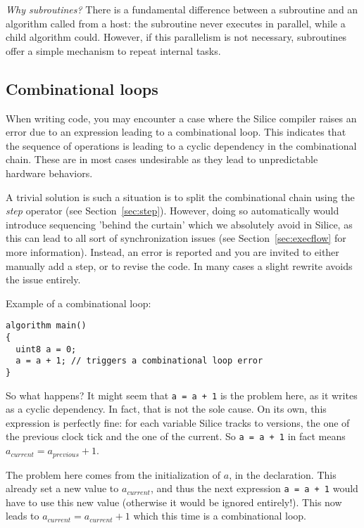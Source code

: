 \documentclass[a4]{article}
\newcommand\silice{Silice}
\begin{document}
\noindent \textit{Why subroutines?} There is a fundamental difference between a subroutine and an algorithm called from 
a host: the subroutine never executes in parallel, while a child algorithm could. However, if this parallelism is not necessary, 
subroutines offer a simple mechanism to repeat internal tasks.


\subsection{Combinational loops}

When writing code, you may encounter a case where the \silice{} compiler
raises an error due to an expression leading to a combinational loop. This
indicates that the sequence of operations is leading to a cyclic dependency
in the combinational chain. These are in most
cases undesirable as they lead to unpredictable hardware behaviors.

A trivial solution is such a situation is to split the combinational chain
using the \textit{step} operator (see Section~\ref{sec:step}). However,
doing so automatically would introduce sequencing 'behind the curtain'
which we absolutely avoid in \silice{}, as this can lead to all sort of synchronization issues (see Section~\ref{sec:execflow} for more information). 
Instead, an error is reported and you are invited to either manually add
a step, or to revise the code. In many cases a slight rewrite avoids the
issue entirely.

\vspace*{2mm}
\noindent Example of a combinational loop:
\begin{verbatim}
algorithm main()
{
  uint8 a = 0;
  a = a + 1; // triggers a combinational loop error
}
\end{verbatim}

So what happens? It might seem that \texttt{a = a + 1} is the problem here, as it writes as a cyclic dependency. In fact, that is not the sole cause. On its own, this expression is perfectly fine: for each variable \silice{} tracks to versions, the one of the previous clock tick and the one of the current. So \texttt{a = a + 1} in fact means $a_{current} = a_{previous} + 1$.

The problem here comes from the initialization of $a$, in the declaration. This already set a new value to $a_{current}$, and thus the next expression \texttt{a = a + 1} would have to use this new value (otherwise it would be ignored entirely!). This now leads to $a_{current} = a_{current} + 1$ which this time is a combinational loop.
\end{document}
